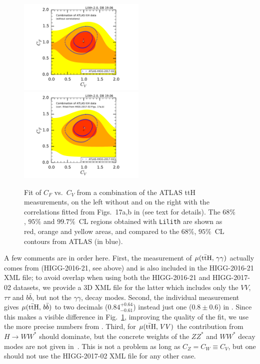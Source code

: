 \begin{figure}[htb!]\centering
\includegraphics[width=0.54\textwidth]{validation/ATLAS/HIGG-2017-02-CVCF-nocorr.pdf}%
\hspace{-13mm}\includegraphics[width=0.54\textwidth]{validation/ATLAS/HIGG-2017-02-CVCF-corr.pdf}%
\vspace*{-2mm}
\caption{Fit of $C_F$ vs.\ $C_V$ from a combination of the ATLAS ttH measurements, on the left without and on the 
right with the correlations fitted from Figs.~17a,b in \cite{Aaboud:2017jvq} (see text for details). 
The  $68\%$,  $95\%$ and $99.7\%$~CL regions obtained with {\tt Lilith} are shown as red, orange and yellow areas, 
and compared to the $68\%$,  $95\%$~CL contours from ATLAS (in blue).}
\label{fig:validation_atlas_ttH}
\end{figure}

A few comments are in order here. First, the measurement of $\mu({\rm t\bar tH},\,\gamma\gamma)$ actually comes from 
\cite{Aaboud:2018xdt} (HIGG-2016-21, see above) and is also included in the HIGG-2016-21 XML file; 
to avoid overlap when using both the HIGG-2016-21 and HIGG-2017-02 datasets, we provide a 3D XML file for the latter 
which includes only the $VV$, $\tau\tau$ and $b\bar b$, but not the $\gamma\gamma$, decay modes. 
Second, the individual measurement \cite{Aaboud:2017rss} gives $\mu({\rm t\bar tH},\,b\bar b)$ to two decimals 
($0.84^{+0.64}_{-0.61}$) instead just one ($0.8\pm 0.6$) in \cite{Aaboud:2017jvq}. Since this makes a visible difference 
in Fig.~\ref{fig:validation_atlas_ttH}, improving the quality of the fit, we use the more precise numbers from  \cite{Aaboud:2017rss}. 
Third, for $\mu({\rm t\bar tH},\,VV)$ the contribution from $H\to WW^*$ should dominate, but the concrete weights of the 
$ZZ^*$ and $WW^*$ decay modes are not given in~\cite{Aaboud:2017jvq}. This is not a problem as long as $C_Z=C_W\equiv C_V$, but one should 
not use the HIGG-2017-02 XML file for any other case.\\

